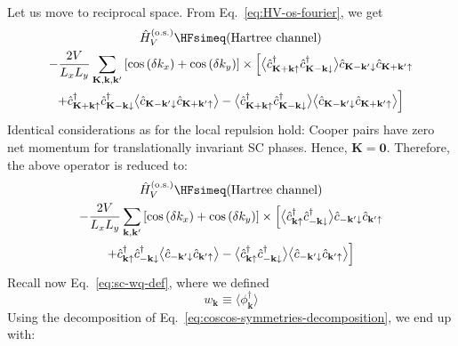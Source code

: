 Let us move to reciprocal space. From Eq.~\eqref{eq:HV-os-fourier}, we get
\begin{multline*}
	\hat H_V^{(\mathrm{o.s.})} \HFsimeq \text{(Hartree channel)} \\
	-\frac{2V}{L_x L_y}
	\sum_{\mathbf{K}, \mathbf{k}, \mathbf{k}'} \left[
		\cos \left(
			\delta k_x
		\right)	+ \cos \left(
			\delta k_y
		\right)	
	\right]
	\times \Big[ 
		\big\langle
			\hat c_{\mathbf{K}+\mathbf{k} \uparrow}^\dagger \hat c_{\mathbf{K}-\mathbf{k} \downarrow}^\dagger
		\big\rangle 
		\hat c_{\mathbf{K}-\mathbf{k}' \downarrow} \hat c_{\mathbf{K}+\mathbf{k}'\uparrow} \\
		+
		\hat c_{\mathbf{K}+\mathbf{k} \uparrow}^\dagger \hat c_{\mathbf{K}-\mathbf{k} \downarrow}^\dagger
		\big\langle 
			\hat c_{\mathbf{K}-\mathbf{k}' \downarrow} \hat c_{\mathbf{K}+\mathbf{k}'\uparrow}
		\big\rangle
		-
		\big\langle
			\hat c_{\mathbf{K}+\mathbf{k} \uparrow}^\dagger \hat c_{\mathbf{K}-\mathbf{k} \downarrow}^\dagger
		\big\rangle
		\big\langle 
			\hat c_{\mathbf{K}-\mathbf{k}' \downarrow} \hat c_{\mathbf{K}+\mathbf{k}'\uparrow}
		\big\rangle
	\Big]
\end{multline*}
Identical considerations as for the local repulsion hold: Cooper pairs have zero net momentum for translationally invariant SC phases. Hence, $\mathbf{K}=\mathbf{0}$. Therefore, the above operator is reduced to:
\begin{multline*}
	\hat H_V^{(\mathrm{o.s.})} \HFsimeq \text{(Hartree channel)} \\
	-\frac{2V}{L_x L_y}
	\sum_{\mathbf{k}, \mathbf{k}'} \left[
		\cos \left(
			\delta k_x
		\right)	+ \cos \left(
			\delta k_y
		\right)	
	\right]
	\times \Big[ 
		\big\langle
			\hat c_{\mathbf{k} \uparrow}^\dagger \hat c_{-\mathbf{k} \downarrow}^\dagger
		\big\rangle 
		\hat c_{-\mathbf{k}' \downarrow} \hat c_{\mathbf{k}'\uparrow} \\
		+
		\hat c_{\mathbf{k} \uparrow}^\dagger \hat c_{-\mathbf{k} \downarrow}^\dagger
		\big\langle 
			\hat c_{-\mathbf{k}' \downarrow} \hat c_{\mathbf{k}'\uparrow}
		\big\rangle
		-
		\big\langle
			\hat c_{\mathbf{k} \uparrow}^\dagger \hat c_{-\mathbf{k} \downarrow}^\dagger
		\big\rangle
		\big\langle 
			\hat c_{-\mathbf{k}' \downarrow} \hat c_{\mathbf{k}'\uparrow}
		\big\rangle
	\Big]
\end{multline*}
Recall now Eq.~\eqref{eq:sc-wq-def}, where we defined
\[
	w_\mathbf{k} \equiv \big\langle
	\phi_\mathbf{k}^\dagger
	\big\rangle
\]
Using the decomposition of Eq.~\eqref{eq:coscos-symmetries-decomposition}, we end up with:
